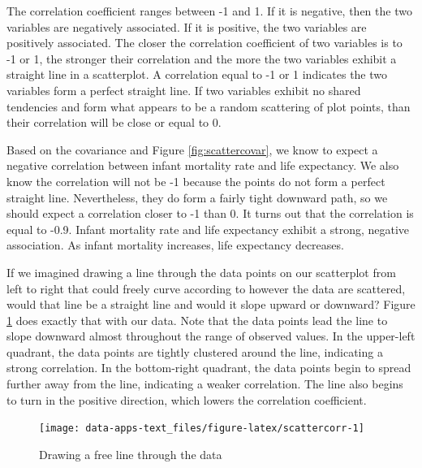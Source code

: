 \documentclass[
]{book}
\begin{document}
The correlation coefficient ranges between -1 and 1. If it is negative, then the two variables are negatively associated. If it is positive, the two variables are positively associated. The closer the correlation coefficient of two variables is to -1 or 1, the stronger their correlation and the more the two variables exhibit a straight line in a scatterplot. A correlation equal to -1 or 1 indicates the two variables form a perfect straight line. If two variables exhibit no shared tendencies and form what appears to be a random scattering of plot points, than their correlation will be close or equal to 0.

Based on the covariance and Figure \ref{fig:scattercovar}, we know to expect a negative correlation between infant mortality rate and life expectancy. We also know the correlation will not be -1 because the points do not form a perfect straight line. Nevertheless, they do form a fairly tight downward path, so we should expect a correlation closer to -1 than 0. It turns out that the correlation is equal to -0.9. Infant mortality rate and life expectancy exhibit a strong, negative association. As infant mortality increases, life expectancy decreases.

If we imagined drawing a line through the data points on our scatterplot from left to right that could freely curve according to however the data are scattered, would that line be a straight line and would it slope upward or downward? Figure \ref{fig:scattercorr} does exactly that with our data. Note that the data points lead the line to slope downward almost throughout the range of observed values. In the upper-left quadrant, the data points are tightly clustered around the line, indicating a strong correlation. In the bottom-right quadrant, the data points begin to spread further away from the line, indicating a weaker correlation. The line also begins to turn in the positive direction, which lowers the correlation coefficient.

\begin{figure}

{\centering \texttt{[image: data-apps-text\_files/figure-latex/scattercorr-1]} 

}

\caption{Drawing a free line through the data}\label{fig:scattercorr}
\end{figure}
\end{document}

